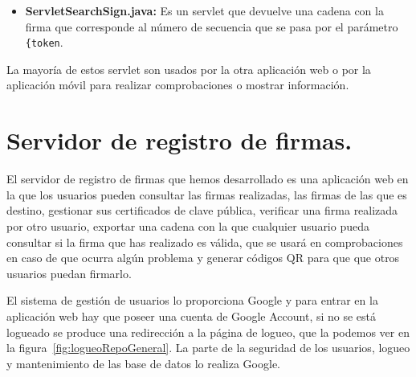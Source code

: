 \begin{itemize}
\begin{lstlisting}[style=Java]
PrintWriter pw = resp.getWriter();
pw.print("<!DOCTYPE html>");
pw.print("<html><head><title>Lista Time Stamp</title><link rel=\"stylesheet\" type=\"text/css\" " + "href=\"css/main.css\"/> <meta charset=\"utf-8\"> </head>");
pw.print("<body><table><tr><th>ID</th><th>Num sec</th><th>Firma</th><th>Date</th></tr><tr> " + "<td>"+ row.getId() +"</td><td>"+ row.getNum_sec() +"</td><td>"+ row.getFirma() +"</td><td>" +	row.getFecha() + "</td></tr> </table></body>");
pw.flush();
\end{lstlisting}

Como se puede ver se crea una tabla en una web, con la etiqueta \lstinline{<TABLE>} y su fila se rellena dinámicamente dependiendo del número de secuencia que se le pase como parámetro.

\item \textbf{ServletSearchSign.java:} Es un servlet que devuelve una cadena con la firma que corresponde al número de secuencia que se pasa por el parámetro \lstinline{{token}.

\end{itemize}

La mayoría de estos servlet son usados por la otra aplicación web o por la aplicación móvil para realizar comprobaciones o mostrar información.


\section{Servidor de registro de firmas.}

El servidor de registro de firmas que hemos desarrollado es una aplicación web en la que los usuarios pueden consultar las firmas realizadas, las firmas de las que es destino, gestionar sus certificados de clave pública, verificar una firma realizada por otro usuario, exportar una cadena con la que cualquier usuario pueda consultar si la firma que has realizado es válida, que se usará en comprobaciones en caso de que ocurra algún problema y generar códigos QR para que que otros usuarios puedan firmarlo.

El sistema de gestión de usuarios lo proporciona Google y para entrar en la aplicación web hay que poseer una cuenta de Google Account, si no se está logueado se produce una redirección a la página de logueo, que la podemos ver en la figura~\ref{fig:logueoRepoGeneral}. La parte de la seguridad de los usuarios, logueo y mantenimiento de las base de datos lo realiza Google.

